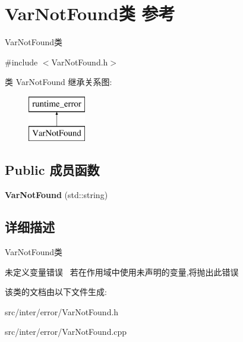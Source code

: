 \hypertarget{class_var_not_found}{}\section{Var\+Not\+Found类 参考}
\label{class_var_not_found}


Var\+Not\+Found类  




{\ttfamily \#include $<$Var\+Not\+Found.\+h$>$}

类 Var\+Not\+Found 继承关系图\+:\begin{figure}[H]
\begin{center}
\leavevmode
\includegraphics[height=2.000000cm]{class_var_not_found}
\end{center}
\end{figure}
\subsection*{Public 成员函数}
\begin{DoxyCompactItemize}
\item 
\mbox{\label{class_var_not_found_a36600e0d18a90f6a594cb582940b5bbc}} 
{\bfseries Var\+Not\+Found} (std\+::string)
\end{DoxyCompactItemize}


\subsection{详细描述}
Var\+Not\+Found类 

未定义变量错误~\newline
若在作用域中使用未声明的变量,将抛出此错误 

该类的文档由以下文件生成\+:\begin{DoxyCompactItemize}
\item 
src/inter/error/Var\+Not\+Found.\+h\item 
src/inter/error/Var\+Not\+Found.\+cpp\end{DoxyCompactItemize}
